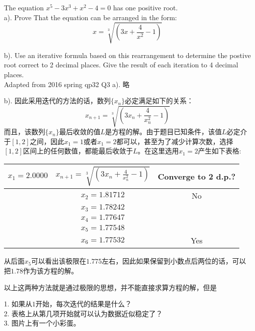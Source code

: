 \begin{ExampleBox}
The equation $x^5-3x^3+x^2-4=0$ has one positive root.\\
a). Prove That the equation can be arranged in the form:
\[
	x=\sqrt[3]{\left(3x+\frac{4}{x^2}-1\right)}
\]

b). Use an iterative formula based on this rearrangement to determine the postive root correct to 2 decimal places. Give the result of each iteration to 4 decimal places.\\
\makebox{}\hfill Adapted from 2016 spring qp32 Q3
\tcblower
a). 略

b). 因此采用迭代的方法的话，数列$\{x_n\}$必定满足如下的关系：
\[
	x_{n+1} =\sqrt[3]{\left(3x_n+\frac{4}{x_n^2}-1\right)}
\] 
而且，该数列$\{x_n\}$最后收敛的值$L$是方程的解。由于题目已知条件，该值$L$必定介于$[1,2]$之间，因此$x_1=1$或者$x_1=2$都可以，甚至为了减少计算次数，选择$[1,2]$区间上的任何数值，都能最后收敛于$L$。在这里选用$x_1=2$产生如下表格:
\begin{table}[H]
\centering
\begin{tabular}{l|c|c|}
\hline
\multicolumn{1}{|l|}{$x_1=2.0000$} & $x_{n+1} =\sqrt[3]{\left(3x_n+\frac{4}{x_n^2}-1\right)}$ & Converge to 2 d.p.? \\ \hline
                                   & $x_2=1.81712$                                            & No                  \\ \cline{2-3} 
                                   & $x_3=1.78242$                                            &                     \\ \cline{2-3} 
                                   & $x_4=1.77647$                                            &                     \\ \cline{2-3} 
                                   & $x_5=1.77548$                                            &                     \\ \cline{2-3} 
                                   & $x_6=1.77532$                                            & Yes                 \\ \cline{2-3} 
\end{tabular}%
\end{table}
从后面$x_5$可以看出该极限在$1.775$左右，因此如果保留到小数点后两位的话，可以把$1.78$作为该方程的解。
\end{ExampleBox}
以上这两种方法就是通过极限的思想，并不能直接求算方程的解，但是

\begin{TaskBox}
1. 如果从$1$开始，每次迭代的结果是什么？\\
2. 表格上从第几项开始就可以认为数据近似稳定了？\\
3. 图片上有一个小彩蛋。
\end{TaskBox}
\clearpage


